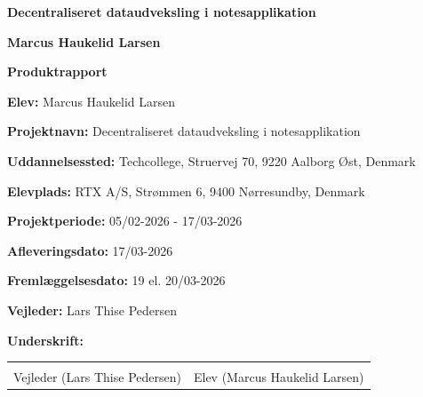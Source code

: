 \documentclass{article}
\newcommand{\projectname}{Decentraliseret dataudveksling i notesapplikation}
\newcommand{\student}{Marcus Haukelid Larsen}
\newcommand{\supervisor}{Lars Thise Pedersen}
\begin{document}

\begin{center}
  {\Huge \textbf{\projectname}}

  \vspace*{\fill}

  {\Large \textbf{\student}}

  \vspace*{\fill}

  {\large \textbf{Produktrapport}}
\end{center}

\thispagestyle{empty}

\newpage
\begin{center}  
  {\large \textbf{Elev:} \student}
  \vspace*{\fill}

  {\large \textbf{Projektnavn:} \projectname}
  \vspace*{\fill}

  {\large \textbf{Uddannelsessted:} Techcollege, Struervej 70, 9220 Aalborg Øst, Denmark}
  \vspace*{\fill}

  {\large \textbf{Elevplads:} RTX A/S, Strømmen 6, 9400 Nørresundby, Denmark}
  \vspace*{\fill}

  {\large \textbf{Projektperiode:} 05/02-2026 - 17/03-2026}
  \vspace*{\fill}

  {\large \textbf{Afleveringsdato:} 17/03-2026}
  \vspace*{\fill}

  {\large \textbf{Fremlæggelsesdato:} 19 el. 20/03-2026}
  \vspace*{\fill}

  {\large \textbf{Vejleder:} \supervisor}
  \vspace*{\fill}

  {\large \textbf{Underskrift:}}
  \vspace*{\fill}
  
  \begin{tabular}{p{6cm} p{6cm}}
    \hrulefill & \hrulefill \\
    Vejleder (\supervisor) & Elev (\student)
  \end{tabular}
\end{center}

\thispagestyle{empty}

\newpage
\tableofcontents

\newpage
\end{document}
